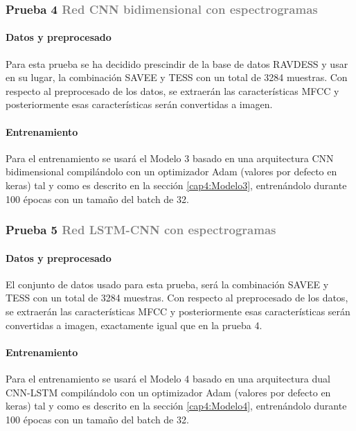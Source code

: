 \documentclass[11pt,a4paper,spanish]{book}
\begin{document}
	\subsubsection[]{\large Prueba 4 {\normalsize \textcolor{Gray}{Red CNN bidimensional con espectrogramas}}}
	\hfill\begin{minipage}{\dimexpr\textwidth-1cm}
		
		\paragraph{Datos y preprocesado} Para esta prueba se ha decidido prescindir de la base de datos RAVDESS y usar en su lugar, la combinación SAVEE y TESS con un total de 3284 muestras. Con respecto al preprocesado de los datos, se extraerán las características MFCC y posteriormente esas características serán convertidas a imagen.
		
		\paragraph{Entrenamiento} Para el entrenamiento se usará el Modelo 3 basado en una arquitectura CNN bidimensional compilándolo con un optimizador Adam (valores por defecto en keras) tal y como es descrito en la sección \ref{cap4:Modelo3}, entrenándolo durante 100 épocas con un tamaño del batch de 32.
	\end{minipage}


	\subsubsection[]{\large Prueba 5 {\normalsize \textcolor{Gray}{Red LSTM-CNN con espectrogramas}}}
	
	\hfill\begin{minipage}{\dimexpr\textwidth-1cm}
		
		\paragraph{Datos y preprocesado} El conjunto de datos usado para esta prueba, será la combinación SAVEE y TESS con un total de 3284 muestras. Con respecto al preprocesado de los datos, se extraerán las características MFCC y posteriormente esas características serán convertidas a imagen, exactamente igual que en la prueba 4.
		\paragraph{Entrenamiento} Para el entrenamiento se usará el Modelo 4 basado en una arquitectura dual CNN-LSTM compilándolo con un optimizador Adam (valores por defecto en keras) tal y como es descrito en la sección \ref{cap4:Modelo4}, entrenándolo durante 100 épocas con un tamaño del batch de 32.
		
	\end{minipage}
\end{document}
